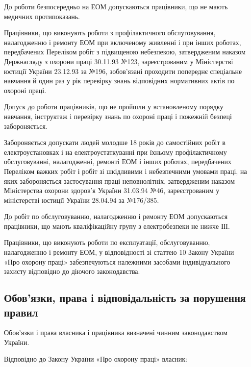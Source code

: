 \documentclass[simple,a4paper,14pt,ukrainian,utf8]{eskdtext}
\begin{document}
\begin{appendices}
                До роботи безпосередньо на ЕОМ допускаються працівники, що не мають медичних протипоказань.

                Працівники, що виконують роботи з профілактичного обслуговування, налагодженню і ремонту ЕОМ при включеному живленні і при інших роботах, передбачених Переліком робіт з підвищеною небезпекою, затвердженим наказом Держнагляду з охорони праці 30.11.93 №123, зареєстрованим у Міністерстві юстиції України 23.12.93 за №196, зобов'язані проходити попереднє спеціальне навчання й один раз у рік перевірку знань відповідних нормативних актів по охороні праці.

                Допуск до роботи працівників, що не пройшли у встановленому порядку навчання, інструктаж і перевірку знань по охороні праці і пожежній безпеці забороняється.

                Забороняється допускати людей молодше 18 років до самостійних робіт в електроустановках і на електроустаткуванні при їхньому профілактичному обслуговуванні, налагодженні, ремонті ЕОМ і інших роботах, передбачених Переліком важких робіт і робіт зі шкідливими і небезпечними умовами праці, на яких забороняється застосування праці неповнолітніх, затвердженим наказом Міністерства охорони здоров'я України 31.03.94 №46, зареєстрованим у міністерстві юстиції України 28.04.94 за №176/385.

                До робіт по обслуговуванню, налагодженню і ремонту ЕОМ допускаються працівники, що мають кваліфікаційну групу з електробезпеки не нижче ІІІ.

                Працівники, що виконують роботи по експлуатації, обслуговуванню, налагодженню і ремонту ЕОМ, у відповідності зі статтею 10 Закону України «Про охорону праці» забезпечуються належними засобами індивідуального захисту відповідно до діючого законодавства.

            \subsection{Обов'язки, права і відповідальність за порушення правил}

                Обов'язки і права власника і працівника визначені чинним законодавством України.

                Відповідно до Закону України «Про охорону праці» власник:


\end{appendices}
\end{document}
